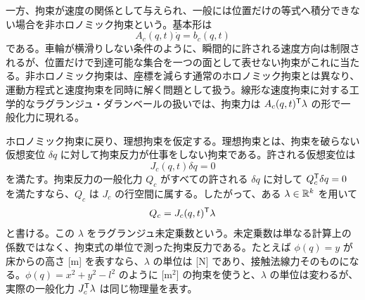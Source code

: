 一方、拘束が速度の関係として与えられ、一般には位置だけの等式へ積分できない場合を非ホロノミック拘束という。基本形は
\begin{equation}
  A_c(q,t)\dot{q}=b_c(q,t)
\end{equation}
である。車輪が横滑りしない条件のように、瞬間的に許される速度方向は制限されるが、位置だけで到達可能な集合を一つの面として表せない拘束がこれに当たる。非ホロノミック拘束は、座標を減らす通常のホロノミック拘束とは異なり、運動方程式と速度拘束を同時に解く問題として扱う。線形な速度拘束に対する工学的なラグランジュ・ダランベールの扱いでは、拘束力は $A_c(q,t)^{\mathsf{T}}\lambda$ の形で一般化力に現れる。

ホロノミック拘束に戻り、理想拘束を仮定する。理想拘束とは、拘束を破らない仮想変位 $\delta q$ に対して拘束反力が仕事をしない拘束である。許される仮想変位は
\begin{equation}
  J_c(q,t)\delta q=0
\end{equation}
を満たす。拘束反力の一般化力 $Q_c$ がすべての許される $\delta q$ に対して $Q_c^{\mathsf{T}}\delta q=0$ を満たすなら、$Q_c$ は $J_c$ の行空間に属する。したがって、ある $\lambda\in\mathbb{R}^k$ を用いて
\begin{equation}
  Q_c=J_c(q,t)^{\mathsf{T}}\lambda
\end{equation}
と書ける。この $\lambda$ をラグランジュ未定乗数という。未定乗数は単なる計算上の係数ではなく、拘束式の単位で測った拘束反力である。たとえば $\phi(q)=y$ が床からの高さ [m] を表すなら、$\lambda$ の単位は [N] であり、接触法線力そのものになる。$\phi(q)=x^2+y^2-l^2$ のように [m$^2$] の拘束を使うと、$\lambda$ の単位は変わるが、実際の一般化力 $J_c^{\mathsf{T}}\lambda$ は同じ物理量を表す。

